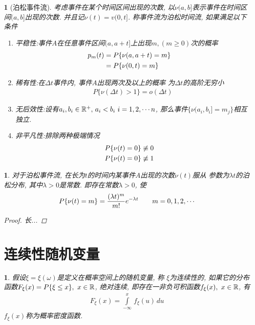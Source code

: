 \newtheorem*{poisson_event_flow}{}
\begin{poisson_event_flow}[泊松事件流]
考虑事件在某个时间区间出现的次数, 以\(\nu(a, b]\)表示事件在时间区间\((a , b]\)出现的次数.
并且记\(\nu(t) = v(0, t]\).
称事件流为泊松时间流, 如果满足以下条件
\begin{enumerate}
\item 平稳性:\quad 事件\(A\)在任意事件区间\((a,a+t]\)上出现\(m, (m\ge 0)\)次的概率
\begin{align}
    p_m(t) &= P\{\nu(a, a+t) = m\}\cr
    &= P\{\nu(0, t) = m\}
\end{align}
\item 稀有性:\quad 在\(\Delta t\)事件内, 事件\(A\)出现两次及以上的概率
为\(\Delta t\)的高阶无穷小
\begin{align}
P\{\nu(\Delta t) > 1\} = o(\Delta t)
\end{align}
\item 无后效性:\quad 设有\(a_i, b_i\in\Rs^+,\, a_i < b_i\,\, i = 1, 2, \cdots n\), 那么事件\(\{\nu(a_i, b_i] = m_j\}\)相互独立.
\item 非平凡性:\quad 排除两种极端情况
\begin{align}
    &P\{\nu(t) = 0\} \not\equiv 0\cr
    &P\{\nu(t) = 0\} \not\equiv 1
\end{align}
\end{enumerate}
\end{poisson_event_flow}

\newtheorem{about_poisson_event}[theorem_root]{\theorem}
\begin{about_poisson_event}
对于泊松事件流, 在长为\(t\)的时间内某事件\(A\)出现的次数\(\nu(t)\)服从
参数为\(\lambda t\)的泊松分布, 其中\(\lambda > 0\)是常数.
即存在常数\(\lambda > 0\), 使
\begin{align}
    P\{\nu(t) = m\} = {(\lambda t)^m\over m!}e^{-\lambda t}\qquad m = 0, 1, 2, \cdots
\end{align}

\begin{proof}
    长...
\end{proof}
\end{about_poisson_event}

\section{连续性随机变量}

\newtheorem{cont_distr_var}[theorem_root]{}
\begin{cont_distr_var}
假设\(\xi = \xi(\omega)\)是定义在概率空间\prbsp 上的随机变量, 称
\(\xi\)为连续性的, 如果它的分布函数\(F_\xi(x) = P\{\xi\le x\},\,\, x\in\Rs\), 
绝对连续, 即存在一非负可积函数\(f_\xi(x),\,\,x\in\Rs\), 有
\begin{align}
F_\xi(x) = \int\limits_{-\infty}^{x}\,f_\xi(u)\,du
\end{align}
\(f_\xi(x)\)称为概率密度函数.
\end{cont_distr_var}


